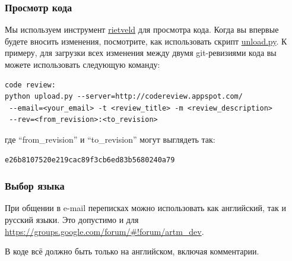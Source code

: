 \documentclass[12pt]{article}
\begin{document}
\subsubsection{Просмотр кода}
Мы используем инструмент
\href{https://code.google.com/p/rietveld/wiki/UploadPyUsage}{rietveld}
для просмотра кода.
Когда вы впервые будете вносить изменения, посмотрите, как использовать скрипт 
\href{http://codereview.appspot.com/static/upload.py}{unload.py}.
К примеру, для загрузки всех изменения между двумя git-ревизиями кода вы можете использовать следующую команду:
\begin{verbatim}
code review:
python upload.py --server=http://codereview.appspot.com/
 --email=<your_email> -t <review_title> -m <review_description>
 --rev=<from_revision>:<to_revision>
\end{verbatim}
где ``from\_revision'' и ``to\_revision'' могут выглядеть так:
\begin{verbatim}
e26b8107520e219cac89f3cb6ed83b5680240a79
\end{verbatim}

\subsubsection{Выбор языка}
При общении в e-mail переписках можно использовать как английский, так и русский языки. Это допустимо и для \url{https://groups.google.com/forum/#!forum/artm_dev}.

В коде всё должно быть только на английском, включая комментарии.
\end{document}
